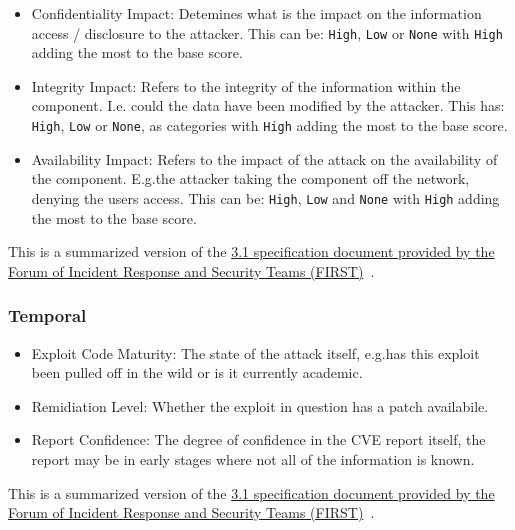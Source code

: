 \documentclass[12pt]{article}
\begin{document}
\begin{itemize}
	\item Confidentiality Impact: Detemines what is the impact on the information access /
	      disclosure to the attacker. This can be: \texttt{High}, \texttt{Low} or \texttt{None} with
	      \texttt{High} adding the most to the base score.

	\item Integrity Impact: Refers to the integrity of the information within the component. I.e.\@
	      could the data have been modified by the attacker. This has: \texttt{High}, \texttt{Low} or
	      \texttt{None}, as categories with \texttt{High} adding the most to the base score.

	\item Availability Impact: Refers to the impact of the attack on the availability of the
	      component. E.g.\@ the attacker taking the component off the network, denying the users
	      access. This can be: \texttt{High}, \texttt{Low} and \texttt{None} with \texttt{High} adding
	      the most to the base score.

\end{itemize}

{\footnotesize This is a summarized version of the
\href{https://www.first.org/cvss/v3.1/specification-document}{3.1 specification document
	provided by the  Forum of Incident Response and Security Teams (FIRST)}~\cite{CVSS_31}. } \\

\subsubsection*{Temporal}

\begin{itemize}

	\item Exploit Code Maturity: The state of the attack itself, e.g.\@ has this exploit been pulled
	      off in the wild or is it currently academic.

	\item Remidiation Level: Whether the exploit in question has a patch availabile.

	\item Report Confidence: The degree of confidence in the CVE report itself, the report may be in
	      early stages where not all of the information is known.

\end{itemize}

{\footnotesize This is a summarized version of the
\href{https://www.first.org/cvss/v3.1/specification-document}{3.1 specification document
	provided by the Forum of Incident Response and Security Teams (FIRST)}~\cite{CVSS_31}.}  \\
\bigskip
\end{document}
